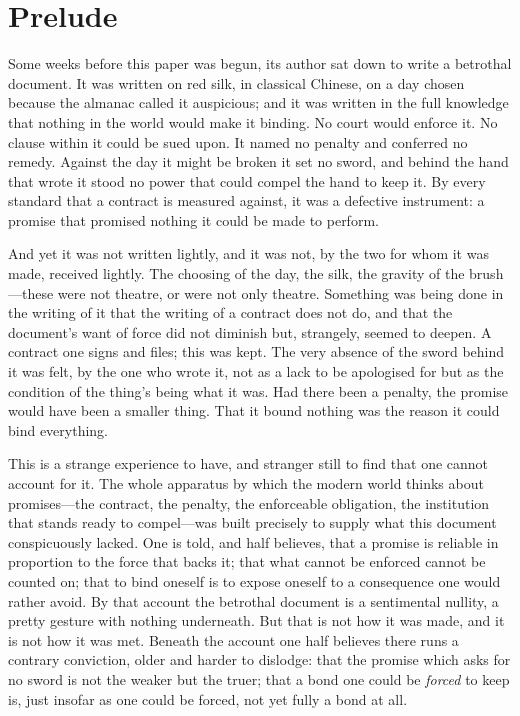 \section*{Prelude}
\label{p13:sec:prelude}

\noindent
Some weeks before this paper was begun, its author sat down to write a betrothal document. It was written on red silk, in classical Chinese, on a day chosen because the almanac called it auspicious; and it was written in the full knowledge that nothing in the world would make it binding. No court would enforce it. No clause within it could be sued upon. It named no penalty and conferred no remedy. Against the day it might be broken it set no sword, and behind the hand that wrote it stood no power that could compel the hand to keep it. By every standard that a contract is measured against, it was a defective instrument: a promise that promised nothing it could be made to perform.

And yet it was not written lightly, and it was not, by the two for whom it was made, received lightly. The choosing of the day, the silk, the gravity of the brush---these were not theatre, or were not only theatre. Something was being done in the writing of it that the writing of a contract does not do, and that the document's want of force did not diminish but, strangely, seemed to deepen. A contract one signs and files; this was kept. The very absence of the sword behind it was felt, by the one who wrote it, not as a lack to be apologised for but as the condition of the thing's being what it was. Had there been a penalty, the promise would have been a smaller thing. That it bound nothing was the reason it could bind everything.

This is a strange experience to have, and stranger still to find that one cannot account for it. The whole apparatus by which the modern world thinks about promises---the contract, the penalty, the enforceable obligation, the institution that stands ready to compel---was built precisely to supply what this document conspicuously lacked. One is told, and half believes, that a promise is reliable in proportion to the force that backs it; that what cannot be enforced cannot be counted on; that to bind oneself is to expose oneself to a consequence one would rather avoid. By that account the betrothal document is a sentimental nullity, a pretty gesture with nothing underneath. But that is not how it was made, and it is not how it was met. Beneath the account one half believes there runs a contrary conviction, older and harder to dislodge: that the promise which asks for no sword is not the weaker but the truer; that a bond one could be \emph{forced} to keep is, just insofar as one could be forced, not yet fully a bond at all.


